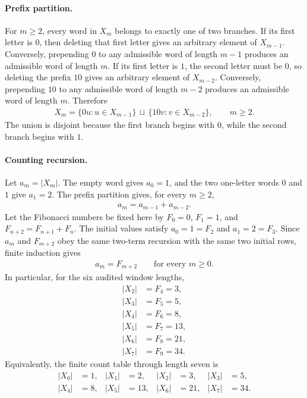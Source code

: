 \paragraph{Prefix partition.}
For $m\geq 2$, every word in $X_m$ belongs to exactly one of two branches. If its first letter is $0$, then deleting that first letter gives an arbitrary element of $X_{m-1}$. Conversely, prepending $0$ to any admissible word of length $m-1$ produces an admissible word of length $m$. If its first letter is $1$, the second letter must be $0$, so deleting the prefix $10$ gives an arbitrary element of $X_{m-2}$. Conversely, prepending $10$ to any admissible word of length $m-2$ produces an admissible word of length $m$. Therefore
$$
\begin{aligned}
X_m = \{0u:u\in X_{m-1}\}\,\sqcup\,\{10v:v\in X_{m-2}\},\qquad m\geq 2.
\end{aligned}
$$
The union is disjoint because the first branch begins with $0$, while the second branch begins with $1$.

\paragraph{Counting recursion.}
Let $a_m=|X_m|$. The empty word gives $a_0=1$, and the two one-letter words $0$ and $1$ give $a_1=2$. The prefix partition gives, for every $m\geq 2$,
$$
\begin{aligned}
a_m=a_{m-1}+a_{m-2}.
\end{aligned}
$$
Let the Fibonacci numbers be fixed here by $F_0=0$, $F_1=1$, and $F_{n+2}=F_{n+1}+F_n$. The initial values satisfy $a_0=1=F_2$ and $a_1=2=F_3$. Since $a_m$ and $F_{m+2}$ obey the same two-term recursion with the same two initial rows, finite induction gives
$$
\begin{aligned}
a_m=F_{m+2}\qquad\text{for every }m\geq 0.
\end{aligned}
$$
In particular, for the six audited window lengths,
$$
\begin{aligned}
|X_2|&=F_4=3,\\
|X_3|&=F_5=5,\\
|X_4|&=F_6=8,\\
|X_5|&=F_7=13,\\
|X_6|&=F_8=21,\\
|X_7|&=F_9=34.
\end{aligned}
$$
Equivalently, the finite count table through length seven is
$$
\begin{aligned}
|X_0|&=1, & |X_1|&=2, & |X_2|&=3, & |X_3|&=5,\\
|X_4|&=8, & |X_5|&=13, & |X_6|&=21, & |X_7|&=34.
\end{aligned}
$$

